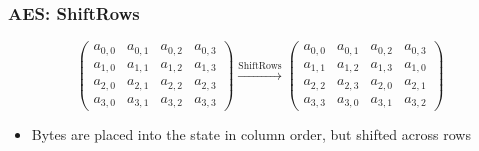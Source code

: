 \documentclass[12pt]{beamer}
\begin{document}
\begin{frame}
\frametitle{AES: ShiftRows}

\[ \left( \begin{array}{cccc}
a_{0,0} & a_{0,1} & a_{0,2} & a_{0,3} \\[0pt]
a_{1,0} & a_{1,1} & a_{1,2} & a_{1,3} \\[0pt]
a_{2,0} & a_{2,1} & a_{2,2} & a_{2,3} \\[0pt]
a_{3,0} & a_{3,1} & a_{3,2} & a_{3,3}\end{array} \right)
\xrightarrow{\text{ShiftRows}}
\left( \begin{array}{cccc}
a_{0,0} & a_{0,1} & a_{0,2} & a_{0,3} \\[0pt]
a_{1,1} & a_{1,2} & a_{1,3} & a_{1,0} \\[0pt]
a_{2,2} & a_{2,3} & a_{2,0} & a_{2,1} \\[0pt]
a_{3,3} & a_{3,0} & a_{3,1} & a_{3,2}\end{array} \right)
\]

\pause

\begin{itemize}
\item Bytes are placed into the state in column order, but shifted across rows
\end{itemize}
\end{frame}
\end{document}
